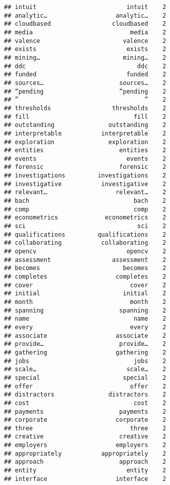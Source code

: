 \documentclass[]{article}
\begin{document}
\begin{verbatim}
## intuit                         intuit    2
## analytic…                   analytic…    2
## cloudbased                 cloudbased    2
## media                           media    2
## valence                       valence    2
## exists                         exists    2
## mining…                       mining…    2
## ddc                               ddc    2
## funded                         funded    2
## sources…                     sources…    2
## “pending                     “pending    2
## ”                                   ”    2
## thresholds                 thresholds    2
## fill                             fill    2
## outstanding               outstanding    2
## interpretable           interpretable    2
## exploration               exploration    2
## entities                     entities    2
## events                         events    2
## forensic                     forensic    2
## investigations         investigations    2
## investigative           investigative    2
## relevant…                   relevant…    2
## bach                             bach    2
## comp                             comp    2
## econometrics             econometrics    2
## sci                               sci    2
## qualifications         qualifications    2
## collaborating           collaborating    2
## opencv                         opencv    2
## assessment                 assessment    2
## becomes                       becomes    2
## completes                   completes    2
## cover                           cover    2
## initial                       initial    2
## month                           month    2
## spanning                     spanning    2
## name                             name    2
## every                           every    2
## associate                   associate    2
## provide…                     provide…    2
## gathering                   gathering    2
## jobs                             jobs    2
## scale…                         scale…    2
## special                       special    2
## offer                           offer    2
## distractors               distractors    2
## cost                             cost    2
## payments                     payments    2
## corporate                   corporate    2
## three                           three    2
## creative                     creative    2
## employers                   employers    2
## appropriately           appropriately    2
## approach                     approach    2
## entity                         entity    2
## interface                   interface    2

\end{verbatim}
\end{document}
